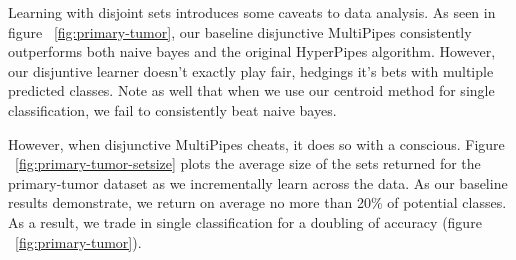 \begin{figure*}
\centering
{}
\caption{Incremental results from a discrete dataset with 22 class values}
\label{fig:primary-tumor}
\end{figure*}

\begin{figure*}
\centering
{}
\caption{Average number of classes contained within disjunction for incremental learning}
\label{fig:primary-tumor-setsize}
\end{figure*}

\begin{figure*}
\centering
{}
\caption{Incremental results from a numeric dataset with 7 discrete classes}
\label{fig:segment}
\end{figure*}

\begin{figure*}
\centering
{}
\caption{Average number of classes contained within disjunction for numeric attribute dataset}
\label{fig:segment-setsize}
\end{figure*}

Learning with disjoint sets introduces some caveats to data analysis. As seen in figure ~\ref{fig:primary-tumor}, our baseline disjunctive MultiPipes consistently outperforms both naive bayes and the original HyperPipes algorithm. However, our disjuntive learner doesn't exactly play fair, hedgings it's bets with multiple predicted classes. Note as well that when we use our centroid method for single classification, we fail to consistently beat naive bayes.

However, when disjunctive MultiPipes cheats, it does so with a conscious. Figure ~\ref{fig:primary-tumor-setsize} plots the average size of the sets returned for the primary-tumor dataset as we incrementally learn across the data. As our baseline results demonstrate, we return on average no more than 20\% of potential classes. As a result, we trade in single classification for a doubling of accuracy (figure ~\ref{fig:primary-tumor}).
